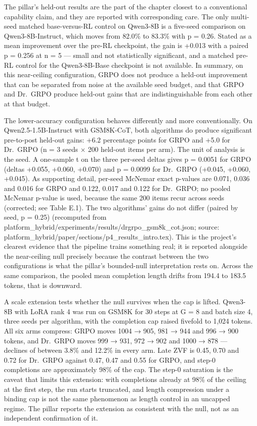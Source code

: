 \documentclass[12pt,a4paper]{report}
\begin{document}
The pillar's held-out results are the part of the chapter closest to a
conventional capability claim, and they are reported with corresponding
care. The only multi-seed matched base-versus-RL control on Qwen3-8B is
a five-seed comparison on Qwen3-8B-Instruct, which moves from 82.0\% to
83.3\% with p = 0.26. Stated as a mean improvement over the pre-RL
checkpoint, the gain is +0.013 with a paired p = 0.256 at n = 5 ---
small and not statistically significant, and a matched pre-RL control
for the Qwen3-8B-Base checkpoint is not available. In summary, on this
near-ceiling configuration, GRPO does not produce a held-out improvement
that can be separated from noise at the available seed budget, and that
GRPO and Dr.~GRPO produce held-out gains that are indistinguishable from
each other at that budget.

The lower-accuracy configuration behaves differently and more
conventionally. On Qwen2.5-1.5B-Instruct with GSM8K-CoT, both algorithms
do produce significant pre-to-post held-out gains: +6.2 percentage
points for GRPO and +5.0 for Dr.~GRPO (n = 3 seeds × 200 held-out items
per arm). The unit of analysis is the seed. A one-sample t on the three
per-seed deltas gives p = 0.0051 for GRPO (deltas +0.055, +0.060,
+0.070) and p = 0.0099 for Dr.~GRPO (+0.045, +0.060, +0.045). As
supporting detail, per-seed McNemar exact p-values are 0.071, 0.036 and
0.016 for GRPO and 0.122, 0.017 and 0.122 for Dr.~GRPO; no pooled
McNemar p-value is used, because the same 200 items recur across seeds
(corrected; see Table E.1). The two algorithms' gains do not differ
(paired by seed, p = 0.25) (recomputed from
platform\_hybrid/experiments/results/drgrpo\_\allowbreak{}gsm8k\_\allowbreak{}cot.json; source:
platform\_hybrid/paper/sections/p4\_\allowbreak{}results\_\allowbreak{}intro.tex). This is the
project's clearest evidence that the pipeline trains something real; it
is reported alongside the near-ceiling null precisely because the
contrast between the two configurations is what the pillar's
bounded-null interpretation rests on. Across the same comparison, the
pooled mean completion length drifts from 194.4 to 183.5 tokens, that is
downward.

A scale extension tests whether the null survives when the cap is
lifted. Qwen3-8B with LoRA rank 4 was run on GSM8K for 30 steps at G = 8
and batch size 4, three seeds per algorithm, with the completion cap
raised fivefold to 1,024 tokens. All six arms compress: GRPO moves 1004
→ 905, 981 → 944 and 996 → 900 tokens, and Dr.~GRPO moves 999 → 931, 972
→ 902 and 1000 → 878 --- declines of between 3.8\% and 12.2\% in every
arm. Late ZVF is 0.45, 0.70 and 0.72 for Dr.~GRPO against 0.47, 0.47 and
0.55 for GRPO, and step-0 completions are approximately 98\% of the cap.
The step-0 saturation is the caveat that limits this extension: with
completions already at 98\% of the ceiling at the first step, the run
starts truncated, and length compression under a binding cap is not the
same phenomenon as length control in an uncapped regime. The pillar
reports the extension as consistent with the null, not as an independent
confirmation of it.
\end{document}
